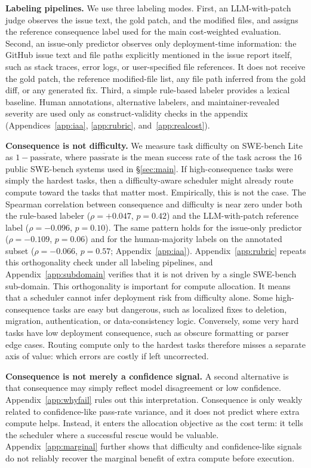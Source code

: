\documentclass{article}
\begin{document}
\textbf{Labeling pipelines.}
We use three labeling modes. First, an LLM-with-patch judge observes
the issue text, the gold patch, and the modified files, and assigns the
reference consequence label used for the main cost-weighted evaluation.
Second, an issue-only predictor observes only deployment-time
information: the GitHub issue text and file paths explicitly mentioned
in the issue report itself, such as stack traces, error logs, or
user-specified file references. It does not receive the gold patch, the
reference modified-file list, any file path inferred from the gold
diff, or any generated fix. Third, a simple rule-based labeler provides
a lexical baseline. Human annotations, alternative labelers, and
maintainer-revealed severity are used only as construct-validity checks
in the appendix (Appendices~\ref{app:iaa}, \ref{app:rubric},
and~\ref{app:realcost}).

\textbf{Consequence is not difficulty.}
We measure task difficulty on SWE-bench Lite as
$1-\overline{\mathrm{passrate}}$, where
$\overline{\mathrm{passrate}}$ is the mean success rate of the task
across the 16 public SWE-bench systems used in
\S\ref{sec:main}. If high-consequence tasks were simply the hardest
tasks, then a difficulty-aware scheduler might already route compute
toward the tasks that matter most. Empirically, this is not the case.
The Spearman correlation between consequence and difficulty is near
zero under both the rule-based labeler
($\rho=+0.047$, $p=0.42$) and the LLM-with-patch reference label
($\rho=-0.096$, $p=0.10$). The same pattern holds for the issue-only
predictor ($\rho=-0.109$, $p=0.06$) and for the human-majority labels
on the annotated subset ($\rho=-0.066$, $p=0.57$;
Appendix~\ref{app:iaa}). Appendix~\ref{app:rubric} repeats this
orthogonality check under all labeling pipelines, and
Appendix~\ref{app:subdomain} verifies that it is not driven by a
single SWE-bench sub-domain.
This orthogonality is important for compute allocation. It means that
a scheduler cannot infer deployment risk from difficulty alone. Some
high-consequence tasks are easy but dangerous, such as localized fixes
to deletion, migration, authentication, or data-consistency logic.
Conversely, some very hard tasks have low deployment consequence, such
as obscure formatting or parser edge cases. Routing compute only to
the hardest tasks therefore misses a separate axis of value: which
errors are costly if left uncorrected.

\textbf{Consequence is not merely a confidence signal.}
A second alternative is that consequence may simply reflect model
disagreement or low confidence. Appendix~\ref{app:whyfail} rules out
this interpretation. Consequence is only weakly related to
confidence-like pass-rate variance, and it does not predict where
extra compute helps. Instead, it enters the allocation objective as the
cost term: it tells the scheduler where a successful rescue would be
valuable. Appendix~\ref{app:marginal} further shows that difficulty
and confidence-like signals do not reliably recover the marginal
benefit of extra compute before execution.
\end{document}
